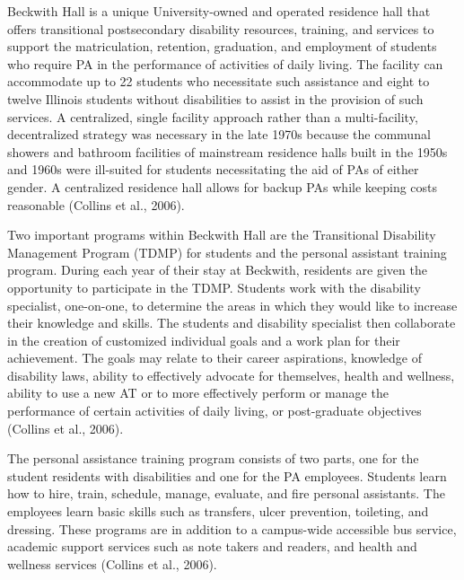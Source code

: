 \documentclass[11.5pt]{sig-alternate} %
\begin{document}
\begin{large}
Beckwith Hall is a unique University-owned and operated residence hall that offers transitional postsecondary disability resources, training, and services to support the matriculation, retention, graduation, and employment of students who require PA in the performance of activities of daily living. The facility can accommodate up to 22 students who necessitate such assistance and eight to twelve Illinois students without disabilities to assist in the provision of such services. A centralized, single facility approach rather than a multi-facility, decentralized strategy was necessary in the late 1970s because the communal showers and bathroom facilities of mainstream residence halls built in the 1950s and 1960s were ill-suited for students necessitating the aid of PAs of either gender. A centralized residence hall allows for backup PAs while keeping costs reasonable (Collins et al., 2006). 

Two important programs within Beckwith Hall are the Transitional Disability Management Program (TDMP) for students and the personal assistant training program. During each year of their stay at Beckwith, residents are given the opportunity to participate in the TDMP. Students work with the disability specialist, one-on-one, to determine the areas in which they would like to increase their knowledge and skills. The students and disability specialist then collaborate in the creation of customized individual goals and a work plan for their achievement. The goals may relate to their career aspirations, knowledge of disability laws, ability to effectively advocate for themselves, health and wellness, ability to use a new AT or to more effectively perform or manage the performance of certain activities of daily living, or post-graduate objectives (Collins et al., 2006).

The personal assistance training program consists of two parts, one for the student residents with disabilities and one for the PA employees. Students learn how to hire, train, schedule, manage, evaluate, and fire personal assistants. The employees learn basic skills such as transfers, ulcer prevention, toileting, and dressing. These programs are in addition to a campus-wide accessible bus service, academic support services such as note takers and readers, and health and wellness services (Collins et al., 2006). 


\end{large}
\end{document}
